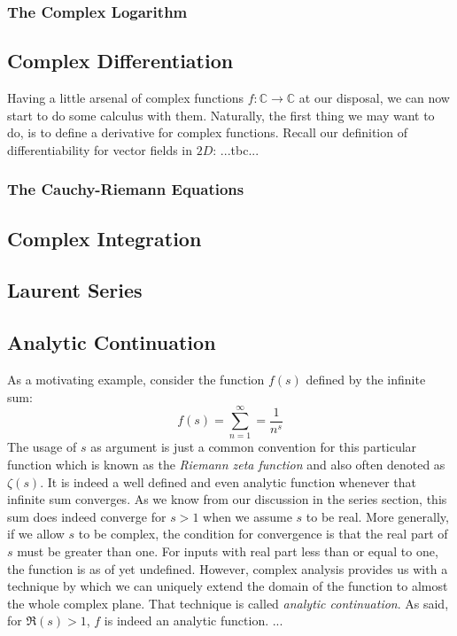 \subsubsection{The Complex Logarithm}


\subsection{Complex Differentiation}
Having a little arsenal of complex functions $f: \mathbb{C} \rightarrow \mathbb{C}$ at our disposal, we can now start to do some calculus with them. Naturally, the first thing we may want to do, is to define a derivative for complex functions. Recall our definition of differentiability for vector fields in $2D$:
...tbc...

\subsubsection{The Cauchy-Riemann Equations}


\subsection{Complex Integration}

\subsection{Laurent Series}

\subsection{Analytic Continuation}
As a motivating example, consider the function $f(s)$ defined by the infinite sum:
\begin{equation}
f(s) = \sum_{n=1}^{\infty} = \frac{1}{n^s}
\end{equation}
The usage of $s$ as argument is just a common convention for this particular function which is known as the \emph{Riemann zeta function} and also often denoted as $\zeta (s)$. It is indeed a well defined and even analytic function whenever that infinite sum converges. As we know from our discussion in the series section, this sum does indeed converge for $s > 1$ when we assume $s$ to be real. More generally, if we allow $s$ to be complex, the condition for convergence is that the real part of $s$ must be greater than one. For inputs with real part less than or equal to one, the function is as of yet undefined. However, complex analysis provides us with a technique by which we can uniquely extend the domain of the function to almost the whole complex plane. That technique is called \emph{analytic continuation}. As said, for $\Re(s) > 1$, $f$ is indeed an analytic function. ...

